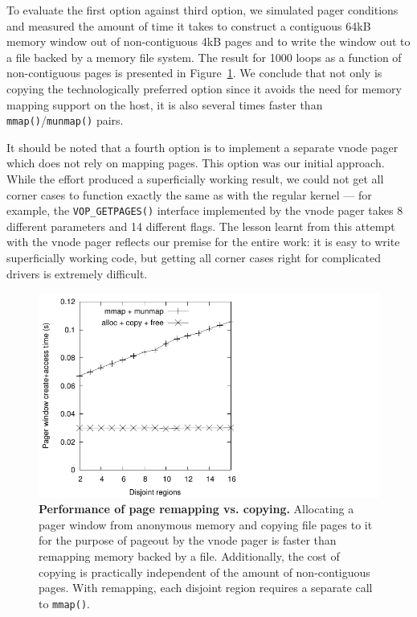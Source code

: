 To evaluate the first option against third option, we simulated
pager conditions and measured the amount of time it takes to
construct a contiguous 64kB memory window out of non-contiguous
4kB pages and to write the window out to a file backed by a memory
file system.  The result for 1000 loops as a function of
non-contiguous pages is presented in Figure~\ref{fig:copyvsmmap}.
We conclude that not only is copying the technologically preferred
option since it avoids the need for memory mapping support on the
host, it is also several times faster than
\texttt{mmap()}/\texttt{munmap()} pairs.

It should be noted that a fourth option is to implement a separate
vnode pager which does not rely on mapping pages.  This option was our
initial approach.  While the effort produced a superficially working
result, we could not get all corner cases to function exactly the
same as with the regular kernel --- for example, the \verb+VOP_GETPAGES()+
interface implemented by the vnode pager takes 8 different parameters
and 14 different flags.  The lesson learnt from this attempt with
the vnode pager reflects our premise for the entire work: it is
easy to write superficially working code, but getting all corner
cases right for complicated drivers is extremely difficult.

\begin{figure}[t]
\includegraphics{copyvsmmap}
\caption[Performance of page remapping vs. copying]{
\textbf{Performance of page remapping vs. copying.}
Allocating a pager window from anonymous memory and copying file
pages to it for the purpose of pageout by the vnode pager is faster
than remapping memory backed by a file.  Additionally, the cost of
copying is practically independent of the amount of non-contiguous
pages.  With remapping, each disjoint region requires a separate
call to \texttt{mmap()}.}
\label{fig:copyvsmmap}
\end{figure}

